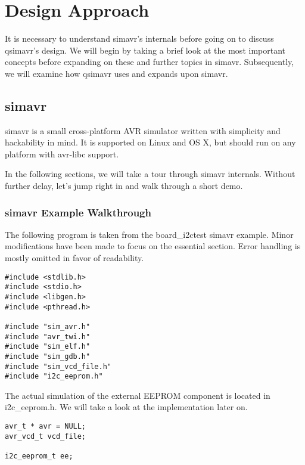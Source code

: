 
\chapter{Design Approach} \label{chapter:designapproach}

It is necessary to understand simavr's internals before going on to discuss
qsimavr's design. We will begin by taking a brief look at the most important
concepts before expanding on these and further topics in simavr. Subsequently,
we will examine how qsimavr uses and expands upon simavr.

\section{simavr}

simavr is a small cross-platform AVR simulator written with simplicity and
hackability in mind. It is supported on Linux and OS X, but should run on any
platform with avr-libc support.

In the following sections, we will take a tour through simavr internals.
Without further delay, let's jump right in and walk through a short demo.

\subsection{simavr Example Walkthrough}

The following program is taken from the board\_i2ctest simavr example. Minor
modifications have been made to focus on the essential section. Error handling
is mostly omitted in favor of readability.

\begin{lstlisting}
#include <stdlib.h>
#include <stdio.h>
#include <libgen.h>
#include <pthread.h>

#include "sim_avr.h"
#include "avr_twi.h"
#include "sim_elf.h"
#include "sim_gdb.h"
#include "sim_vcd_file.h"
#include "i2c_eeprom.h"
\end{lstlisting}

The actual simulation of the external EEPROM component is located in
i2c\_eeprom.h. We will take a look at the implementation later on.

\begin{lstlisting}
avr_t * avr = NULL;
avr_vcd_t vcd_file;

i2c_eeprom_t ee;
\end{lstlisting}

